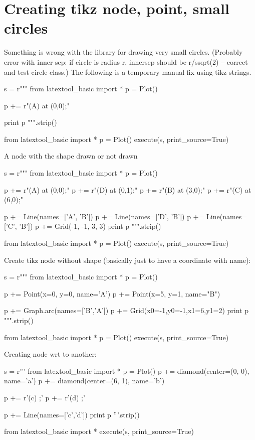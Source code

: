 \section{Creating tikz node, point, small circles}


Something is wrong with the library for drawing very small circles.
(Probably error with inner sep: if circle is radius r, innersep should be
r/ssqrt(2) -- correct and test circle class.)
The following is a temporary manual fix using tikz strings.
\begin{python}
s = r"""
from latextool_basic import *
p = Plot()

p += r"\node[draw,shape=circle,minimum size=0.1cm,fill=blue,inner sep=0](A) at (0,0){};"

print p
""".strip()

from latextool_basic import *
p = Plot()
execute(s, print_source=True)
\end{python}




\newpage
A node with the shape drawn or not drawn
\begin{python}
s = r"""
from latextool_basic import *
p = Plot()

p += r"\node[draw,shape=circle,minimum size=1cm,inner sep=0](A) at (0,0){};"
p += r"\node[draw,shape=circle,minimum size=1cm,inner sep=0](D) at (0,1){};"
p += r"\node[draw=none,shape=circle,minimum size=1cm,inner sep=0](B) at (3,0){};"
p += r"\node[draw,shape=circle,minimum size=1cm,inner sep=0](C) at (6,0){};"

p += Line(names=['A', 'B'])
p += Line(names=['D', 'B'])
p += Line(names=['C', 'B'])
p += Grid(-1, -1, 3, 3)
print p
""".strip()

from latextool_basic import *
p = Plot()
execute(s, print_source=True)
\end{python}




\newpage
Create tikz node without shape (basically just to have a coordinate with name):
\begin{python}
s = r"""
from latextool_basic import *
p = Plot()

p += Point(x=0, y=0, name='A')
p += Point(x=5, y=1, name="B")

p += Graph.arc(names=['B','A'])
p += Grid(x0=-1,y0=-1,x1=6,y1=2)
print p
""".strip()

from latextool_basic import *
p = Plot()
execute(s, print_source=True)
\end{python}




\newpage
Creating node wrt to another:
\begin{python}
s = r'''
from latextool_basic import *
p = Plot()
p += diamond(center=(0, 0), name='a')
p += diamond(center=(6, 1), name='b')

p += r'\node[right=0.0cm of a, inner sep=0.0cm, outer sep=0.0cm] (c) {};'
p += r'\node[below left=0.0cm of b, inner sep=0.0cm, outer sep=0.0cm] (d) {};'

p += Line(names=['c','d'])
print p
'''.strip()

from latextool_basic import *
execute(s, print_source=True)
\end{python}
